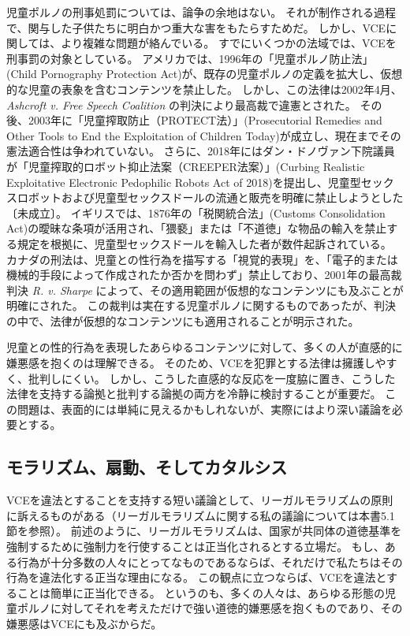\documentclass[paper=a4,book,openany]{jlreq}
\begin{document}
児童ポルノの刑事処罰については、論争の余地はない。
それが制作される過程で、関与した子供たちに明白かつ重大な害をもたらすためだ。
しかし、VCEに関しては、より複雑な問題が絡んでいる。
すでにいくつかの法域では、VCEを刑事罰の対象としている。
アメリカでは、1996年の「児童ポルノ防止法」(Child Pornography Protection Act)が、既存の児童ポルノの定義を拡大し、仮想的な児童の表象を含むコンテンツを禁止した。
しかし、この法律は2002年4月、\emph{Ashcroft v. Free Speech Coalition} の判決により最高裁で違憲とされた。
その後、2003年に「児童搾取防止（PROTECT法）」(Prosecutorial Remedies and Other Tools to End the Exploitation of Children Today)が成立し、現在までその憲法適合性は争われていない。
さらに、2018年にはダン・ドノヴァン下院議員が「児童搾取的ロボット抑止法案（CREEPER法案）」(Curbing Realistic Exploitative Electronic Pedophilic Robots Act of 2018)を提出し、児童型セックスロボットおよび児童型セックスドールの流通と販売を明確に禁止しようとした〔未成立〕。
イギリスでは、1876年の「税関統合法」(Customs Consolidation Act)の曖昧な条項が活用され、「猥褻」または「不道徳」な物品の輸入を禁止する規定を根拠に、児童型セックスドールを輸入した者が数件起訴されている。
カナダの刑法は、児童との性行為を描写する「視覚的表現」を、「電子的または機械的手段によって作成されたか否かを問わず」禁止しており、2001年の最高裁判決 \emph{R. v. Sharpe} によって、その適用範囲が仮想的なコンテンツにも及ぶことが明確にされた。
この裁判は実在する児童ポルノに関するものであったが、判決の中で、法律が仮想的なコンテンツにも適用されることが明示された。

児童との性的行為を表現したあらゆるコンテンツに対して、多くの人が直感的に嫌悪感を抱くのは理解できる。
そのため、VCEを犯罪とする法律は擁護しやすく、批判しにくい。
しかし、こうした直感的な反応を一度脇に置き、こうした法律を支持する論拠と批判する論拠の両方を冷静に検討することが重要だ。
この問題は、表面的には単純に見えるかもしれないが、実際にはより深い議論を必要とする。

\subsection{モラリズム、扇動、そしてカタルシス}

VCEを違法とすることを支持する短い議論として、リーガルモラリズムの原則に訴えるものがある（リーガルモラリズムに関する私の議論については本書5.1節を参照）。
前述のように、リーガルモラリズムは、国家が共同体の道徳基準を強制するために強制力を行使することは正当化されるとする立場だ。
もし、ある行為が十分多数の人々にとってなものであるならば、それだけで私たちはその行為を違法化する正当な理由になる。
この観点に立つならば、VCEを違法とすることは簡単に正当化できる。
というのも、多くの人々は、あらゆる形態の児童ポルノに対してそれを考えただけで強い道徳的嫌悪感を抱くものであり、その嫌悪感はVCEにも及ぶからだ。
\end{document}
